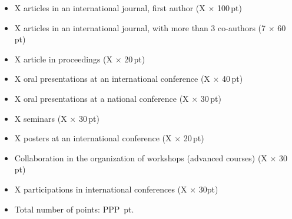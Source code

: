 \documentclass[a4paper, 11pt]{article}
\begin{document}
\begin{itemize}
    \item X articles in an international journal, first author (X $\times$ 100\,pt) \\[-1.8em]
    \item X articles in an international journal, with more than 3 co-authors (7 $\times$ 60\,pt) \\[-1.8em]
    \item X article in proceedings (X $\times$ 20\,pt) \\[-1.8em]
    \item X oral presentations at an international conference (X $\times$ 40\,pt)  \\[-1.8em]
    \item X oral presentations at a national conference (X $\times$ 30\,pt)  \\[-1.8em]
    \item X seminars (X $\times$ 30\,pt)  \\[-1.8em]
    \item X posters at an international conference (X $\times$ 20\,pt)  \\[-1.8em]
    \item Collaboration in the organization of workshops (advanced courses) (X $\times$ 30\,pt)  \\[-1.8em]
    \item X participations in international conferences (X $\times$ 30pt)  %
    \item[] \hfill Total number of points: PPP \,pt.
\end{itemize}
\end{document}
